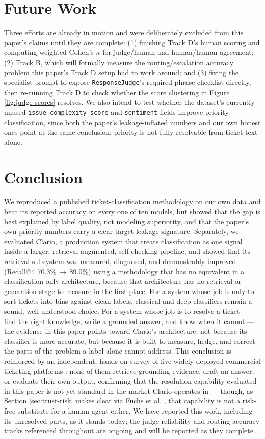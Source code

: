 \documentclass[conference]{IEEEtran}
\begin{document}
\section{Future Work}
\label{sec:future-work}
Three efforts are already in motion and were deliberately excluded from this paper's claims until they are complete: (1) finishing Track D's human scoring and computing weighted Cohen's $\kappa$ for judge/human and human/human agreement; (2) Track B, which will formally measure the routing/escalation accuracy problem this paper's Track D setup had to work around; and (3) fixing the specialist prompt to expose \texttt{ResponseJudge}'s required-phrase checklist directly, then re-running Track D to check whether the score clustering in Figure \ref{fig:judge-scores} resolves. We also intend to test whether the dataset's currently unused \texttt{issue\_complexity\_score} and \texttt{sentiment} fields improve priority classification, since both the paper's leakage-inflated numbers and our own honest ones point at the same conclusion: priority is not fully resolvable from ticket text alone.

\section{Conclusion}
We reproduced a published ticket-classification methodology on our own data and beat its reported accuracy on every one of ten models, but showed that the gap is best explained by label quality, not modeling superiority, and that the paper's own priority numbers carry a clear target-leakage signature. Separately, we evaluated Clario, a production system that treats classification as one signal inside a larger, retrieval-augmented, self-checking pipeline, and showed that its retrieval subsystem was measured, diagnosed, and demonstrably improved (Recall@4 70.3\%\,$\rightarrow$\,89.0\%) using a methodology that has no equivalent in a classification-only architecture, because that architecture has no retrieval or generation stage to measure in the first place. For a system whose job is only to sort tickets into bins against clean labels, classical and deep classifiers remain a sound, well-understood choice. For a system whose job is to resolve a ticket --- find the right knowledge, write a grounded answer, and know when it cannot --- the evidence in this paper points toward Clario's architecture: not because its classifier is more accurate, but because it is built to measure, hedge, and correct the parts of the problem a label alone cannot address. This conclusion is reinforced by an independent, hands-on survey of five widely deployed commercial ticketing platforms \cite{hampel2024}: none of them retrieve grounding evidence, draft an answer, or evaluate their own output, confirming that the resolution capability evaluated in this paper is not yet standard in the market Clario operates in --- though, as Section \ref{sec:trust-risk} makes clear via Fuchs et al. \cite{fuchs2022}, that capability is not a risk-free substitute for a human agent either. We have reported this work, including its unresolved parts, as it stands today; the judge-reliability and routing-accuracy tracks referenced throughout are ongoing and will be reported as they complete.
\end{document}
